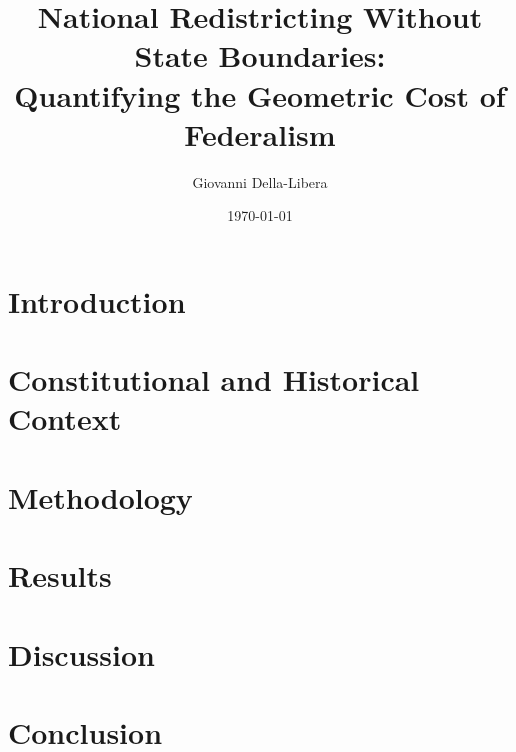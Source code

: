\documentclass[11pt]{article}
\title{National Redistricting Without State Boundaries: \\
Quantifying the Geometric Cost of Federalism}
\author{Giovanni Della-Libera}
\date{\today}
\begin{document}
\maketitle

\begin{abstract}

\end{abstract}

\section{Introduction}


\section{Constitutional and Historical Context}


\section{Methodology}


\section{Results}


\section{Discussion}


\section{Conclusion}




\end{document}
